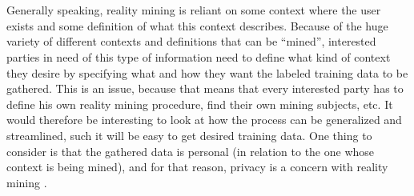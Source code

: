 \\\\
Generally speaking, reality mining is reliant on some context where the user exists and some definition of what this context describes. Because of the huge variety of different contexts and definitions that can be ``mined'', interested parties in need of this type of information need to define what kind of context they desire by specifying what and how they want the labeled training data to be gathered. This is an issue, because that means that every interested party has to define his own reality mining procedure, find their own mining subjects, etc. It would therefore be interesting to look at how the process can be generalized and streamlined, such it will be easy to get desired training data. One thing to consider is that the gathered data is personal (in relation to the one whose context is being mined), and for that reason, privacy is a concern with reality mining \parencite{madan2009_reality_mining_privacy}. 

